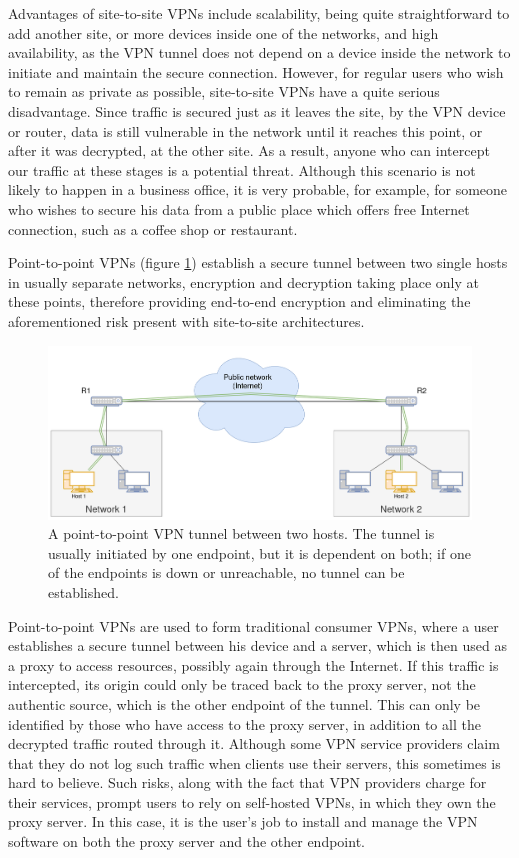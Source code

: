 \documentclass[a4paper,12pt]{report}
\begin{document}
		Advantages of site-to-site VPNs include scalability, being quite straightforward to add another site, or more devices inside one of the networks, and high availability, as the VPN tunnel does not depend on a device inside the network to initiate and maintain the secure connection. However, for regular users who wish to remain as private as possible, site-to-site VPNs have a quite serious disadvantage. Since traffic is secured just as it leaves the site, by the VPN device or router, data is still vulnerable in the network until it reaches this point, or after it was decrypted, at the other site. As a result, anyone who can intercept our traffic at these stages is a potential threat. Although this scenario is not likely to happen in a business office, it is very probable, for example, for someone who wishes to secure his data from a public place which offers free Internet connection, such as a coffee shop or restaurant.
		
		Point-to-point VPNs (figure \ref{fig:point-to-point_VPN}) establish a secure tunnel between two single hosts in usually separate networks, encryption and decryption taking place only at these points, therefore providing end-to-end encryption and eliminating the aforementioned risk present with site-to-site architectures.
		\begin{figure}[h]
			\includegraphics[width=\textwidth]{point-to-point_VPN}
			\centering
			\caption{A point-to-point VPN tunnel between two hosts. The tunnel is usually initiated by one endpoint, but it is dependent on both; if one of the endpoints is down or unreachable, no tunnel can be established.}
			\label{fig:point-to-point_VPN}
		\end{figure}
		
		Point-to-point VPNs are used to form traditional consumer VPNs, where a user establishes a secure tunnel between his device and a server, which is then used as a proxy to access resources, possibly again through the Internet. If this traffic is intercepted, its origin could only be traced back to the proxy server, not the authentic source, which is the other endpoint of the tunnel. This can only be identified by those who have access to the proxy server, in addition to all the decrypted traffic routed through it. Although some VPN service providers claim that they do not log such traffic when clients use their servers, this sometimes is hard to believe. Such risks, along with the fact that VPN providers charge for their services, prompt users to rely on self-hosted VPNs, in which they own the proxy server. In this case, it is the user's job to install and manage the VPN software on both the proxy server and the other endpoint.
		
\end{document}
